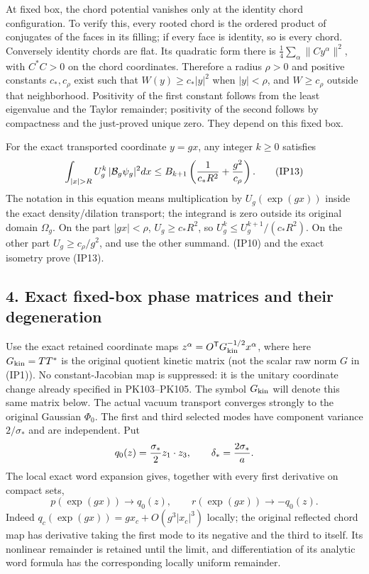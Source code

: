 \documentclass[11pt]{article}
\begin{document}
At fixed box, the chord potential vanishes only at the identity chord
configuration. To verify this, every rooted chord is the ordered product
of conjugates of the faces in its filling; if every face is identity,
so is every chord. Conversely identity chords are flat. Its quadratic
form there is \(\frac14\sum_\alpha\|Cy^\alpha\|^2\), with
\(C^*C>0\) on the chord coordinates. Therefore a radius \(\rho>0\)
and positive constants \(c_*,c_\rho\) exist such that
\(W(y)\ge c_*|y|^2\) when \(|y|<\rho\), and
\(W\ge c_\rho\) outside that neighborhood. Positivity of the first
constant follows from the least eigenvalue and the Taylor remainder;
positivity of the second follows by compactness and the just-proved
unique zero. They depend on this fixed box.

For the exact transported coordinate \(y=gx\), any integer \(k\ge0\)
satisfies
\[
 \int_{|x|>R} U_g^k\,|\mathcal B_g\psi_g|^2dx
 \le B_{k+1}\left({1\over c_*R^2}+{g^2\over c_\rho}\right).
 \tag{IP13}
\]
The notation in this equation means multiplication by
\(U_g(\exp(gx))\) inside the exact density/dilation transport;
the integrand is zero outside its original domain \(\Omega_g\).
On the part \(|gx|<\rho\), \(U_g\ge c_*R^2\), so
\(U_g^k\le U_g^{k+1}/(c_*R^2)\). On the other part
\(U_g\ge c_\rho/g^2\), and use the other summand. (IP10)
and the exact isometry prove (IP13).

\subsection*{4. Exact fixed-box phase matrices and their degeneration}

Use the exact retained coordinate maps
\(z^\alpha=O^{\mathsf T}G_{\rm kin}^{-1/2}x^\alpha\), where here
\(G_{\rm kin}=TT^*\) is the original quotient kinetic matrix (not the
scalar raw norm \(G\) in (IP1)). No constant-Jacobian map is suppressed:
it is the unitary coordinate change already specified in PK103–PK105.
The symbol \(G_{\rm kin}\) will denote this same matrix below.
The actual vacuum transport converges strongly to the original Gaussian
\(\Phi_0\). The first and third selected modes have component variance
\(2/\sigma_*\) and are independent. Put
\[
 q_0(z)={\sigma_*\over2}z_1\cdot z_3,\qquad
 \delta_*={2\sigma_*\over a}.
\]
The local exact word expansion gives, together with every first
derivative on compact sets,
\[
 p(\exp(gx))\longrightarrow q_0(z),\qquad
 r(\exp(gx))\longrightarrow-q_0(z).\tag{IP14}
\]
Indeed \(q_c(\exp(gx))=g x_c+O(g^3|x_c|^3)\) locally;
the original reflected chord map has derivative taking the first mode
to its negative and the third to itself. Its nonlinear remainder is
retained until the limit, and differentiation of its analytic word
formula has the corresponding locally uniform remainder.
\end{document}
